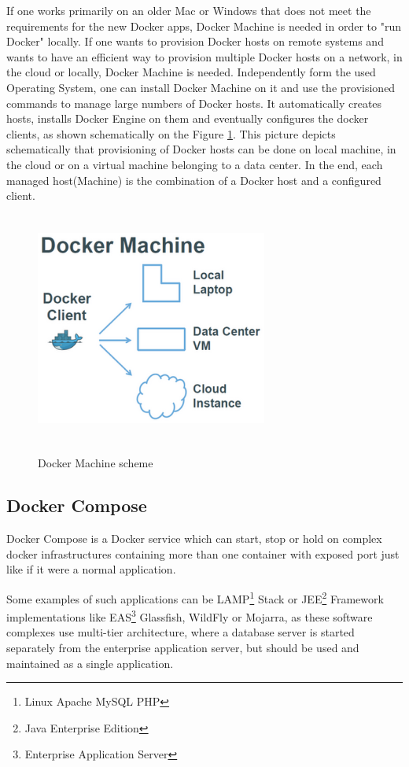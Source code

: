 If one works primarily on an older Mac or Windows that
does not meet the requirements for the new Docker apps,
Docker Machine is needed in order to "run Docker" locally.
If one wants to provision Docker hosts on remote systems and wants to have
an efficient way to provision multiple Docker hosts on a network,
in the cloud or locally, Docker Machine is needed.
Independently form the used Operating System, one can install
Docker Machine on it and use the provisioned commands to manage
large numbers of Docker hosts\cite{MTBAHeise}.
It automatically creates hosts,
installs Docker Engine on them and eventually
configures the docker clients, as shown schematically on the
Figure \ref{fig:DockerMachinePic}.
This picture depicts schematically that provisioning of Docker hosts can be done
on local machine, in the cloud or on a virtual machine belonging
to a data center. In the end, each managed
host(Machine) is the combination of a Docker host and a configured client.

\begin{figure}
\includegraphics[height=3in, width=3in]{DockerMachine}
\caption{Docker Machine scheme}
\cite{DockerMachinePic}
\label{fig:DockerMachinePic}
\end{figure}

\subsection{Docker Compose}

Docker Compose is a Docker service which can start,
stop or hold on complex docker infrastructures
containing more than one container with exposed port
just like if it were a normal application\cite{DockerCompose}.

Some examples of such applications
can be LAMP\footnote{Linux Apache MySQL PHP} Stack
or JEE\footnote{Java Enterprise Edition} Framework
implementations like EAS\footnote{Enterprise Application Server}
Glassfish, WildFly or Mojarra, as these software
complexes use multi-tier architecture, where a database server is
started separately from the enterprise application server,
but should be used and maintained as a single application.

